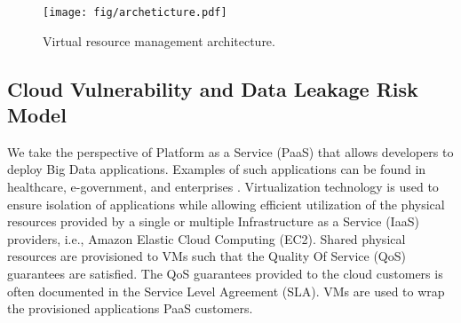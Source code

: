 

\begin{figure}[t!]
    \begin{center}
            \texttt{[image: fig/archeticture.pdf]}
        \caption{Virtual resource management architecture.}
        \vspace{-2.0em}
        \label{fig:arch}
       \end{center}         
\end{figure} 




\subsection{Cloud Vulnerability and Data Leakage Risk Model}
We take the perspective of Platform as a Service (PaaS) that allows developers to deploy Big Data applications. Examples of such applications can be found in healthcare, e-government, and enterprises \cite{kim2014big}. Virtualization technology is used to ensure isolation of applications while allowing efficient utilization of the physical resources provided by a single or multiple Infrastructure as a Service (IaaS) providers, i.e., Amazon Elastic Cloud Computing (EC2). Shared physical resources are provisioned to VMs such that the Quality Of Service (QoS) guarantees are satisfied. The QoS guarantees provided to the cloud customers is often documented in the Service Level Agreement (SLA). VMs are used to wrap the provisioned applications PaaS customers. 

